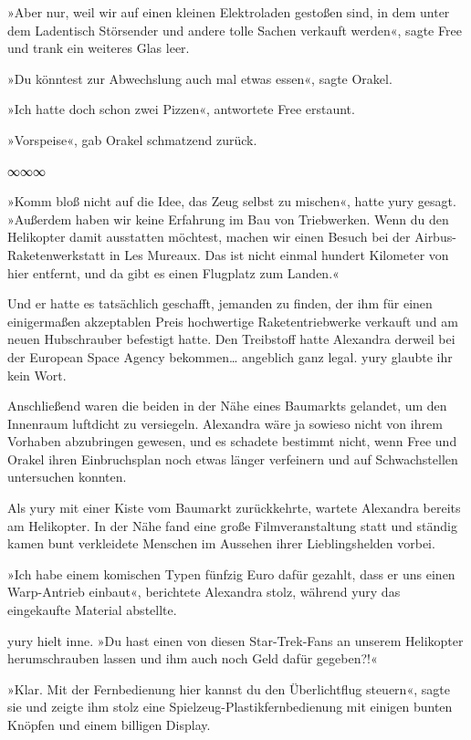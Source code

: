 »Aber nur, weil wir auf einen kleinen Elektroladen gestoßen sind, in dem unter dem Ladentisch Störsender und andere tolle Sachen verkauft werden«, sagte Free und trank ein weiteres Glas leer.

»Du könntest zur Abwechslung auch mal etwas essen«, sagte Orakel.

»Ich hatte doch schon zwei Pizzen«, antwortete Free erstaunt.

»Vorspeise«, gab Orakel schmatzend zurück.

\begin{center}
    ∞∞∞
\end{center}

»Komm bloß nicht auf die Idee, das Zeug selbst zu mischen«, hatte yury gesagt. »Außerdem haben wir keine Erfahrung im Bau von Triebwerken. Wenn du den Helikopter damit ausstatten möchtest, machen wir einen Besuch bei der Airbus-Raketenwerkstatt in Les Mureaux. Das ist nicht einmal hundert Kilometer von hier entfernt, und da gibt es einen Flugplatz zum Landen.«

Und er hatte es tatsächlich geschafft, jemanden zu finden, der ihm für einen einigermaßen akzeptablen Preis hochwertige Raketentriebwerke verkauft und am neuen Hubschrauber befestigt hatte. Den Treibstoff hatte Alexandra derweil bei der European Space Agency bekommen… angeblich ganz legal. yury glaubte ihr kein Wort.

Anschließend waren die beiden in der Nähe eines Baumarkts gelandet, um den Innenraum luftdicht zu versiegeln. Alexandra wäre ja sowieso nicht von ihrem Vorhaben abzubringen gewesen, und es schadete bestimmt nicht, wenn Free und Orakel ihren Einbruchsplan noch etwas länger verfeinern und auf Schwachstellen untersuchen konnten.

Als yury mit einer Kiste vom Baumarkt zurückkehrte, wartete Alexandra bereits am Helikopter. In der Nähe fand eine große Filmveranstaltung statt und ständig kamen bunt verkleidete Menschen im Aussehen ihrer Lieblingshelden vorbei.

»Ich habe einem komischen Typen fünfzig Euro dafür gezahlt, dass er uns einen Warp-Antrieb einbaut«, berichtete Alexandra stolz, während yury das eingekaufte Material abstellte.

yury hielt inne. »Du hast einen von diesen Star-Trek-Fans an unserem Helikopter herumschrauben lassen und ihm auch noch Geld dafür gegeben?!«

»Klar. Mit der Fernbedienung hier kannst du den Überlichtflug steuern«, sagte sie und zeigte ihm stolz eine Spielzeug-Plastikfernbedienung mit einigen bunten Knöpfen und einem billigen Display.

